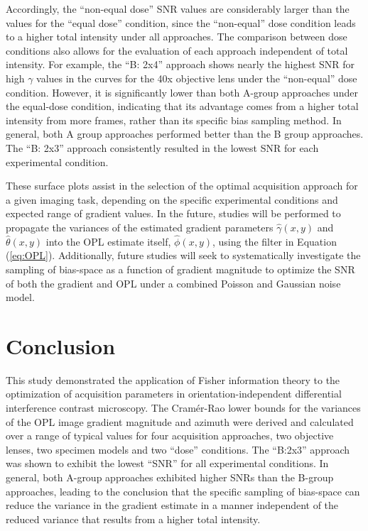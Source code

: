 \documentclass[aps, secnumarabic, amssymb, notitlepage]{article}
\begin{document}
Accordingly, the ``non-equal dose'' SNR values are considerably larger than the values for the ``equal dose'' condition, since the ``non-equal'' dose condition leads to a higher total intensity under all approaches. The comparison between dose conditions also allows for the evaluation of each approach independent of total intensity. For example, the ``B: 2x4'' approach shows nearly the highest SNR for high $\gamma$ values in the curves for the 40x objective lens under the ``non-equal'' dose condition. However, it is significantly lower than both A-group approaches under the equal-dose condition, indicating that its advantage comes from a higher total intensity from more frames, rather than its specific bias sampling method. In general, both A group approaches performed better than the B group approaches. The ``B: 2x3'' approach consistently resulted in the lowest SNR for each experimental condition.

These surface plots assist in the selection of the optimal acquisition approach for a given imaging task, depending on the specific experimental conditions and expected range of gradient values. In the future, studies will be performed to propagate the variances of the estimated gradient parameters $\hat{\gamma}(x,y)$ and $\hat{\theta}(x,y)$ into the OPL estimate itself, $\hat{\phi}(x,y)$, using the filter in Equation (\ref{eq:OPL}). Additionally, future studies will seek to systematically investigate the sampling of bias-space as a function of gradient magnitude to optimize the SNR of both the gradient and OPL under a combined Poisson and Gaussian noise model. 

\section{Conclusion}

This study demonstrated the application of Fisher information theory to the optimization of acquisition parameters in orientation-independent differential interference contrast microscopy. The Cram\'er-Rao lower bounds for the variances of the OPL image gradient magnitude and azimuth were derived and calculated over a range of typical values for four acquisition approaches, two objective lenses, two specimen models and two ``dose'' conditions. The ``B:2x3'' approach was shown to exhibit the lowest ``SNR'' for all experimental conditions. In general, both A-group approaches exhibited higher SNRs than the B-group approaches, leading to the conclusion that the specific sampling of bias-space can reduce the variance in the gradient estimate in a manner independent of the reduced variance that results from a higher total intensity. 





\end{document}

